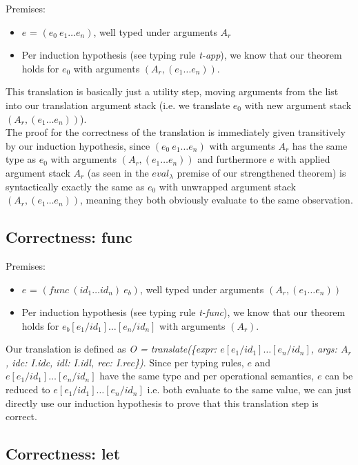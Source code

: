 \documentclass[letterpaper,12pt]{article}
\begin{document}
Premises:
\begin{itemize}
	\item $e$ = $(e_0\: e_1 \dots e_n)$, well typed under arguments $A_r$
	\item Per induction hypothesis (see typing rule \textit{t-app}), we
		know that our theorem holds for $e_0$ with arguments
		$(A_r, (e_1 \dots e_n))$.
\end{itemize}

This translation is basically just a utility step, moving arguments
from the list into our translation argument stack (i.e. we translate
$e_0$ with new argument stack $(A_r, (e_1 \dots e_n))$). \\
The proof for the correctness of the translation is immediately given transitively
by our induction hypothesis, since $(e_0\: e_1 \dots e_n)$ with arguments 
$A_r$ has the same type as $e_0$ with arguments $(A_r, (e_1 \dots e_n))$
and furthermore $e$ with applied argument stack $A_r$ (as seen in the $eval_\lambda$
premise of our strengthened theorem) is syntactically
exactly the same as $e_0$ with unwrapped argument stack $(A_r, (e_1 \dots e_n))$,
meaning they both obviously evaluate to the same observation.

\subsection{Correctness: func}

Premises:
\begin{itemize}
	\item $e$ = $(func\: (id_1 \dots id_n)\: e_b)$, well typed
		under arguments $(A_r, (e_1 \dots e_n))$
	\item Per induction hypothesis (see typing rule \textit{t-func}), we
		know that our theorem holds for $e_b[e_1 / id_1]\dots[e_n / id_n]$ with arguments
		$(A_r)$.
\end{itemize}

Our translation is defined as 
\textit{O = translate(\{expr: $e[e_1 / id_1]\dots[e_n / id_n]$, args: $A_r$,
idc: I.idc, idl: I.idl, rec: I.rec\})}. Since per typing rules,
$e$ and $e[e_1 / id_1]\dots[e_n / id_n]$ have the same type and
per operational semantics, $e$ can be reduced to
$e[e_1 / id_1]\dots[e_n / id_n]$ i.e. both evaluate to the same value,
we can just directly use our induction hypothesis to prove that
this translation step is correct.

\subsection{Correctness: let}
\end{document}
